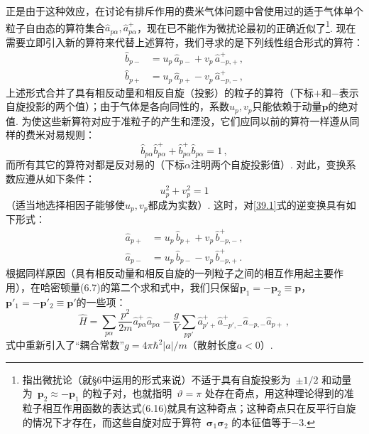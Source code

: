 正是由于这种效应，在讨论有排斥作用的费米气体问题中曾使用过的适于气体单个粒子自由态的算符集合$\hat a_{p\alpha},\hat a^{+}_{p\alpha}$，现在已不能作为微扰论最初的正确近似了\footnote{指出微扰论（就§6中运用的形式来说）不适于具有自旋投影为~$\pm1/2$ 和动量为~$\bm p_2\approx-\bm p_1$ 的粒子对，也就指明~$\vartheta=\pi$ 处存在奇点，用这种理论得到的准粒子相互作用函数的表达式(6.16)就具有这种奇点；这种奇点只在反平行自旋的情况下才存在，而这些自旋对应于算符~$\bm\sigma_1\bm\sigma_2$ 的本征值等于$-3$.}. 现在需要立即引入新的算符来代替上述算符，我们寻求的是下列线性组合形式的算符：
\begin{equation}
\begin{aligned}
\hat b_{p-} &= u_p\,\hat a_{p-} + v_p\,\hat a^{+}_{-p,+}\,,\\
\hat b_{p+} &= u_p\,\hat a_{p+} - v_p\,\hat a^{+}_{-p,-}\,,
\end{aligned}
\label{39.1}
\end{equation}
上述形式合并了具有相反动量和相反自旋（投影）的粒子的算符（下标$+$和$-$表示自旋投影的两个值）；由于气体是各向同性的，系数$u_p,v_p$只能依赖于动量$\bm p$的绝对值. 为使这些新算符对应于准粒子的产生和湮没，它们应同以前的算符一样遵从同样的费米对易规则：
\begin{equation}
\hat b_{p\alpha}\hat b^{+}_{p\alpha} + \hat b^{+}_{p\alpha}\hat b_{p\alpha} = 1\,,
\label{39.2}
\end{equation}
而所有其它的算符对都是反对易的（下标$\alpha$注明两个自旋投影值）. 对此，变换系数应遵从如下条件：
\begin{equation}
u_p^2 + v_p^2 = 1
\label{39.3}
\end{equation}
（适当地选择相因子能够使$u_p,v_p$都成为实数）. 这时，对\eqref{39.1}式的逆变换具有如下形式：
\begin{equation}
\begin{aligned}
\hat a_{p+} &= u_p\,\hat b_{p+} + v_p\,\hat b^{+}_{-p,-}\,,\\
\hat a_{p-} &= u_p\,\hat b_{p-} - v_p\,\hat b^{+}_{-p,+}\,.
\end{aligned}
\label{39.4}
\end{equation}
根据同样原因（具有相反动量和相反自旋的一列粒子之间的相互作用起主要作用），在哈密顿量(6.7)的第二个求和式中，我们只保留$\bm p_1=-\bm p_2\equiv\bm p$，$\bm p'_1=-\bm p'_2\equiv\bm p'$的一些项：
\begin{equation}
\hat H = \sum_{p\alpha}\frac{p^2}{2m}\hat a^{+}_{p\alpha}\hat a_{p\alpha}
- \frac{g}{V}\sum_{pp'}\hat a^{+}_{p'+}\hat a^{+}_{-p',-}\hat a_{-p,-}\hat a_{p+}\,,
\label{39.5}
\end{equation}
式中重新引入了“耦合常数”$g=4\pi\hbar^2|a|/m$（散射长度$a<0$）.

